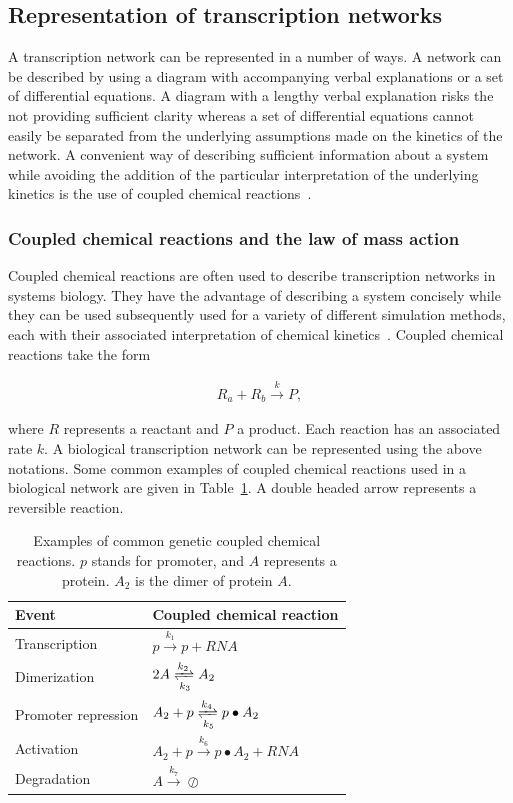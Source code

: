 \subsection{Representation of transcription networks}
A transcription network can be represented in a number of ways. A network can be described by using a diagram with accompanying verbal explanations or a set of differential equations. A diagram with a lengthy verbal explanation risks the not providing sufficient clarity whereas a set of differential equations cannot easily be separated from the underlying assumptions made on the kinetics of the network. A convenient way of describing sufficient information about a system while avoiding the addition of the particular interpretation of the underlying kinetics is the use of coupled chemical reactions~\autocite{Wilkinson:2006td}. 

\subsubsection{Coupled chemical reactions and the law of mass action}

Coupled chemical reactions are often used to describe transcription networks in systems biology. They have the advantage of describing a system concisely while they can be used subsequently used for a variety of different simulation methods, each with their associated interpretation of chemical kinetics~\autocite{Wilkinson:2006td}. Coupled chemical reactions take the form


\begin{align}
	R_a + R_b \xrightarrow{k} P, \label{eq:example_eq}
\end{align}

\noindent where $R$ represents a reactant and $P$ a product. Each reaction has an associated rate $k$. A biological transcription network can be represented using the above notations. Some common examples of coupled chemical reactions used in a biological network are given in Table~\ref{tab:chem_reac_ex}. A double headed arrow represents a reversible reaction. 


\begin{table}[tb]
\centering
\caption{Examples of common genetic coupled chemical reactions. $p$ stands for promoter, and $A$ represents a protein. $A_2$ is the dimer of protein $A$.  }
\label{tab:chem_reac_ex}
\begin{tabular}{@{}ll@{}}
\toprule
Event & Coupled chemical reaction \\ \midrule
Transcription & $p  \xrightarrow{k_1} p + RNA$ \\
Dimerization & $2A \xrightleftharpoons[k_3]{k_2} A_2$ \\
Promoter repression & $A_2 + p \xrightleftharpoons[k_5]{k_4} p\bullet A_2$ \\
Activation & $A_2 + p \xrightarrow{k_6} p\bullet A_2 + RNA$ \\
Degradation & $A \xrightarrow{k_7}\oslash $ \\ \bottomrule
\end{tabular}
\end{table}

